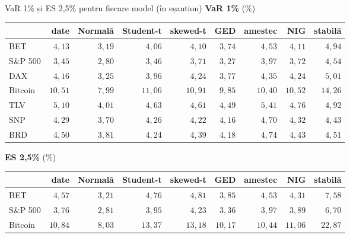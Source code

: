 \begin{frame}{VaR 1\% și ES 2,5\% pentru fiecare model (în eșantion)}
\itemsize{\footnotesize}
\textbf{VaR 1\%} (\%)\begin{center}
\scriptsize
\begin{tabular}{lrrrrrrrr}
\toprule
& date & Normală & Student-t & skewed-t & GED & amestec & NIG & stabilă \\
\midrule
BET & $4{,}13$ & $3{,}19$ & $4{,}06$ & $4{,}10$ & $3{,}74$ & $4{,}53$ & $4{,}11$ & $4{,}94$ \\
S\&P 500 & $3{,}45$ & $2{,}80$ & $3{,}46$ & $3{,}71$ & $3{,}27$ & $3{,}97$ & $3{,}72$ & $4{,}54$ \\
DAX & $4{,}16$ & $3{,}25$ & $3{,}96$ & $4{,}24$ & $3{,}77$ & $4{,}35$ & $4{,}24$ & $5{,}01$ \\
Bitcoin & $10{,}51$ & $7{,}99$ & $11{,}06$ & $10{,}91$ & $9{,}85$ & $10{,}40$ & $10{,}52$ & $14{,}26$ \\
TLV & $5{,}10$ & $4{,}01$ & $4{,}63$ & $4{,}61$ & $4{,}49$ & $5{,}41$ & $4{,}76$ & $4{,}92$ \\
SNP & $4{,}29$ & $3{,}70$ & $4{,}26$ & $4{,}22$ & $4{,}16$ & $4{,}70$ & $4{,}32$ & $4{,}43$ \\
BRD & $4{,}50$ & $3{,}81$ & $4{,}24$ & $4{,}39$ & $4{,}18$ & $4{,}74$ & $4{,}43$ & $4{,}51$ \\
\bottomrule
\end{tabular}
\end{center}
\textbf{ES 2,5\%} (\%)\begin{center}
\scriptsize
\begin{tabular}{lrrrrrrrr}
\toprule
& date & Normală & Student-t & skewed-t & GED & amestec & NIG & stabilă \\
\midrule
BET & $4{,}57$ & $3{,}21$ & $4{,}76$ & $4{,}81$ & $3{,}85$ & $4{,}53$ & $4{,}31$ & $7{,}58$ \\
S\&P 500 & $3{,}76$ & $2{,}81$ & $3{,}95$ & $4{,}23$ & $3{,}36$ & $3{,}97$ & $3{,}89$ & $6{,}70$ \\
Bitcoin & $10{,}84$ & $8{,}03$ & $13{,}37$ & $13{,}18$ & $10{,}17$ & $10{,}44$ & $11{,}06$ & $22{,}87$ \\
\bottomrule
\end{tabular}
\end{center}
\end{frame}

